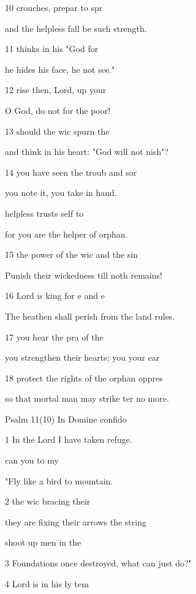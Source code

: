 10  crouches, prepar to spr 

and the helpless fall be such strength. 

11  thinks in his  "God for 

he hides his face, he  not see." 

12 rise then, Lord,  up your  

O God, do not for the poor! 

13  should the wic spurn the  

and think in his heart: "God will not nish"? 

14  you have seen the troub and sor 

you note it, you take  in hand. 

 helpless trusts self to  

for you are the helper of  orphan. 

15  the power of the wic and the sin 

Punish their wickedness till noth remains! 

16  Lord is king for e and e 

The heathen shall perish from the land  rules. 

17  you hear the pra of the  

you strengthen their hearts; you  your ear 

18  protect the rights of the orphan  oppres 

so that mortal man may strike ter no more. 

Psalm 11(10) In Domine confido 


1 In the Lord I have taken  refuge. 

 can you  to my  

"Fly like a bird to  mountain. 

2  the wic bracing their  

they are fixing their arrows  the string 

 shoot up men in the  

3 Foundations once destroyed, what can  just do?" 

4  Lord is in his ly tem 

